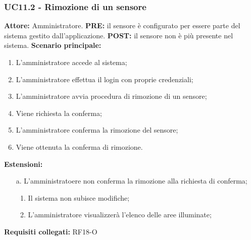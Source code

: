 \documentclass[a4paper, 12pt]{article}
\begin{document}
\subsubsection{UC11.2 - Rimozione di un sensore}
\textbf{Attore:} Amministratore.\newline
\textbf{PRE:} il sensore è configurato per essere parte del sistema gestito dall'applicazione.\newline
\textbf{POST:} il sensore non è più presente nel sistema.\newline
\textbf{Scenario principale:}
\begin{enumerate}
    \item L'amministratore accede al sistema;
    \item L'amministratore effettua il login con proprie credenziali;
    \item L'amministratore avvia procedura di rimozione di un sensore;
    \item Viene richiesta la conferma;
    \item L'amministratore conferma la rimozione del sensore;
    \item Viene ottenuta la conferma di rimozione.
\end{enumerate}
\textbf{Estensioni:}
\begin{itemize}
    \item [a.] L'amministratoere non conferma la rimozione alla richiesta di conferma;
          \begin{enumerate}
              \item Il sistema non subisce modifiche;
              \item L'amministratore visualizzerà l'elenco delle aree illuminate;
          \end{enumerate}
\end{itemize}
\textbf{Requisiti collegati:} RF18-O\newline
\end{document}
